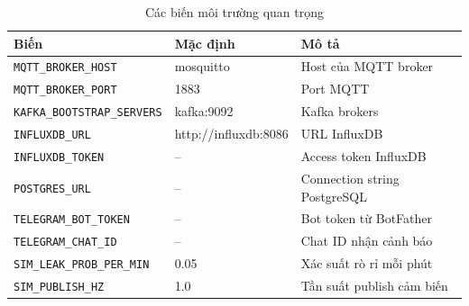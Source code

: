 \begin{table}[H]
\centering
\caption{Các biến môi trường quan trọng}
\begin{tabular}{lll}
\toprule
\textbf{Biến} & \textbf{Mặc định} & \textbf{Mô tả} \\
\midrule
\texttt{MQTT\_BROKER\_HOST}    & mosquitto & Host của MQTT broker \\
\texttt{MQTT\_BROKER\_PORT}    & 1883      & Port MQTT \\
\texttt{KAFKA\_BOOTSTRAP\_SERVERS} & kafka:9092 & Kafka brokers \\
\texttt{INFLUXDB\_URL}         & http://influxdb:8086 & URL InfluxDB \\
\texttt{INFLUXDB\_TOKEN}       & --        & Access token InfluxDB \\
\texttt{POSTGRES\_URL}         & --        & Connection string PostgreSQL \\
\texttt{TELEGRAM\_BOT\_TOKEN}  & --        & Bot token từ BotFather \\
\texttt{TELEGRAM\_CHAT\_ID}    & --        & Chat ID nhận cảnh báo \\
\texttt{SIM\_LEAK\_PROB\_PER\_MIN} & 0.05  & Xác suất rò rỉ mỗi phút \\
\texttt{SIM\_PUBLISH\_HZ}      & 1.0       & Tần suất publish cảm biến \\
\bottomrule
\end{tabular}
\end{table}
